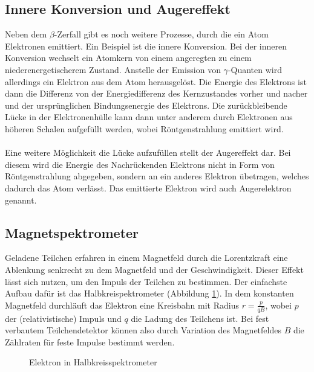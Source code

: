 \subsection{Innere Konversion und Augereffekt}
Neben dem $\beta$-Zerfall gibt es noch weitere Prozesse, durch die ein Atom Elektronen emittiert. Ein Beispiel ist die innere Konversion. Bei der inneren Konversion wechselt ein Atomkern von einem angeregten zu einem niederenergetischerem Zustand. Anstelle der Emission von $\gamma$-Quanten wird allerdings ein Elektron aus dem Atom herausgelöst. Die Energie des Elektrons ist dann die Differenz von der Energiedifferenz des Kernzustandes vorher und nacher und der ursprünglichen Bindungsenergie des Elektrons. Die zurückbleibende Lücke in der Elektronenhülle kann dann unter anderem durch Elektronen aus höheren Schalen aufgefüllt werden, wobei Röntgenstrahlung emittiert wird.\\ \\
Eine weitere Möglichkeit die Lücke aufzufüllen stellt der Augereffekt dar. Bei diesem wird die Energie des Nachrückenden Elektrons nicht in Form von Röntgenstrahlung abgegeben, sondern an ein anderes Elektron übetragen, welches dadurch das Atom verlässt. Das emittierte Elektron wird auch Augerelektron genannt.

\subsection{Magnetspektrometer}
Geladene Teilchen erfahren in einem Magnetfeld durch die Lorentzkraft eine Ablenkung senkrecht zu dem Magnetfeld und der Geschwindigkeit. Dieser Effekt lässt sich nutzen, um den Impuls der Teilchen zu bestimmen. Der einfachste Aufbau dafür ist das Halbkreispektrometer (Abbildung \ref{fig:halbkreis}). In dem konstanten Magnetfeld durchläuft das Elektron eine Kreisbahn mit Radius $r=\frac{p}{qB}$, wobei $p$ der (relativistische) Impuls und $q$ die Ladung des Teilchens ist. Bei fest verbautem Teilchendetektor können also durch Variation des Magnetfeldes $B$ die Zählraten für feste Impulse bestimmt werden.
\begin{figure}[h]
  \centering
  \caption{Elektron in Halbkreisspektrometer}
  \label{fig:halbkreis}
\end{figure}

